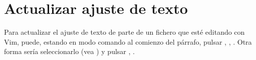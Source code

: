 \section{Actualizar ajuste de texto}\label{sec:vim-act-aj}
Para actualizar el ajuste de texto de parte de un fichero que esté editando con Vim, puede, estando en modo
comando al comienzo del párrafo, pulsar , , \tecla{\}}. Otra forma sería seleccionarlo (vea
) y pulsar , .
